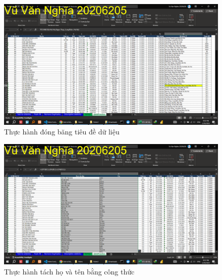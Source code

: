 \documentclass{article}
\begin{document}
\begin{figure}[h]
    \centering
    \includegraphics[scale = 0.15]{Video1/ThucHanh/2.png}
    \caption{Thực hành  đóng băng tiêu đề dữ liệu}
\end{figure}

\begin{figure}[h]
    \centering
    \includegraphics[scale = 0.15]{Video1/ThucHanh/3.png}
    \caption{Thực hành tách họ và tên bằng công thức}
\end{figure}
\end{document}
